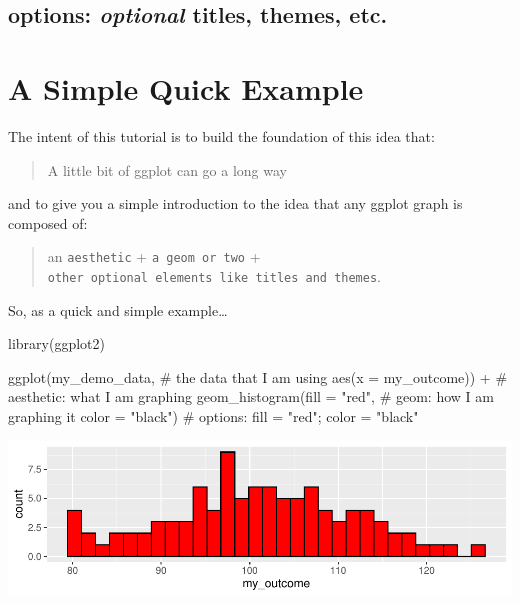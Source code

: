\documentclass[12pt,]{article}
\newenvironment{Shaded}{}{}
\newcommand{\CommentTok}[1]{\textcolor[rgb]{0.00,0.50,0.00}{#1}}
\newcommand{\DataTypeTok}[1]{#1}
\newcommand{\KeywordTok}[1]{\textcolor[rgb]{0.00,0.00,1.00}{#1}}
\newcommand{\NormalTok}[1]{#1}
\newcommand{\OperatorTok}[1]{#1}
\newcommand{\StringTok}[1]{\textcolor[rgb]{0.00,0.50,0.50}{#1}}
\begin{document}
\hypertarget{options-optional-titles-themes-etc.}{%
\subsection{\texorpdfstring{\textbf{options}: \emph{optional} titles,
themes,
etc.}{options: optional titles, themes, etc.}}\label{options-optional-titles-themes-etc.}}

\hypertarget{a-simple-quick-example}{%
\section{A Simple Quick Example}\label{a-simple-quick-example}}

The intent of this tutorial is to build the foundation of this idea
that:

\begin{quote}
A little bit of ggplot can go a long way
\end{quote}

and to give you a simple introduction to the idea that any ggplot graph
is composed of:

\begin{quote}
an \texttt{aesthetic} + \texttt{a\ geom\ or\ two} +
\texttt{other\ optional\ elements\ like\ titles\ and\ themes}.
\end{quote}

So, as a quick and simple example\ldots{}

\begin{Shaded}
\begin{Highlighting}[]
\KeywordTok{library}\NormalTok{(ggplot2)}

\KeywordTok{ggplot}\NormalTok{(my_demo_data, }\CommentTok{# the data that I am using}
       \KeywordTok{aes}\NormalTok{(}\DataTypeTok{x =}\NormalTok{ my_outcome)) }\OperatorTok{+}\StringTok{ }\CommentTok{# aesthetic: what I am graphing}
\StringTok{  }\KeywordTok{geom_histogram}\NormalTok{(}\DataTypeTok{fill =} \StringTok{"red"}\NormalTok{, }\CommentTok{# geom: how I am graphing it}
                 \DataTypeTok{color =} \StringTok{"black"}\NormalTok{) }\CommentTok{# options: fill = "red"; color = "black"}
\end{Highlighting}
\end{Shaded}

\includegraphics{introduction-to-ggplot2_files/figure-latex/unnamed-chunk-3-1.pdf}
\end{document}
